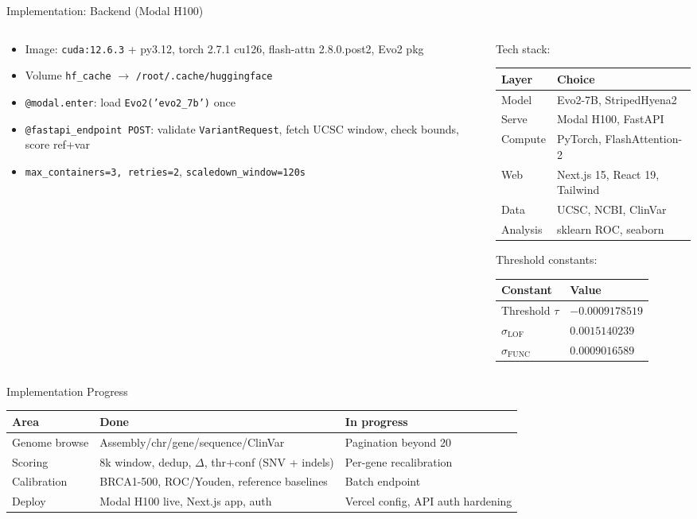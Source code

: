 \documentclass[aspectratio=169,10pt]{beamer}
\begin{document}
\begin{frame}{Implementation: Backend (Modal H100)}
\begin{columns}[T]
\begin{column}{0.5\textwidth}
\begin{itemize}\small
\item Image: \texttt{cuda:12.6.3} + py3.12, torch 2.7.1 cu126, flash-attn 2.8.0.post2, Evo2 pkg
\item Volume \texttt{hf\_cache} $\rightarrow$ \texttt{/root/.cache/huggingface}
\item \texttt{@modal.enter}: load \texttt{Evo2('evo2\_7b')} once
\item \texttt{@fastapi\_endpoint POST}: validate \texttt{VariantRequest}, fetch UCSC window, check bounds, score ref+var
\item \texttt{max\_containers=3, retries=2}, \texttt{scaledown\_window=120s}
\end{itemize}
\end{column}
\begin{column}{0.5\textwidth}
\small Tech stack:
\begin{tabular}{@{}ll@{}}
\toprule
Layer & Choice \\
\midrule
Model & Evo2-7B, StripedHyena2 \\
Serve & Modal H100, FastAPI \\
Compute & PyTorch, FlashAttention-2 \\
Web & Next.js 15, React 19, Tailwind \\
Data & UCSC, NCBI, ClinVar \\
Analysis & sklearn ROC, seaborn \\
\bottomrule
\end{tabular}
\small Threshold constants:
\begin{tabular}{@{}ll@{}}
\toprule
Constant & Value \\
\midrule
Threshold $\tau$ & $-0.0009178519$ \\
$\sigma_{\mathrm{LOF}}$ & $0.0015140239$ \\
$\sigma_{\mathrm{FUNC}}$ & $0.0009016589$ \\
\bottomrule
\end{tabular}
\end{column}
\end{columns}
\end{frame}

\begin{frame}{Implementation Progress}
\begin{tabular}{@{}lll@{}}
\toprule
Area & Done & In progress \\
\midrule
Genome browse & Assembly/chr/gene/sequence/ClinVar & Pagination beyond 20 \\
Scoring & 8k window, dedup, $\Delta$, thr+conf (SNV + indels) & Per-gene recalibration \\
Calibration & BRCA1-500, ROC/Youden, reference baselines & Batch endpoint \\
Deploy & Modal H100 live, Next.js app, auth & Vercel config, API auth hardening \\
\bottomrule
\end{tabular}
\end{frame}
\end{document}

